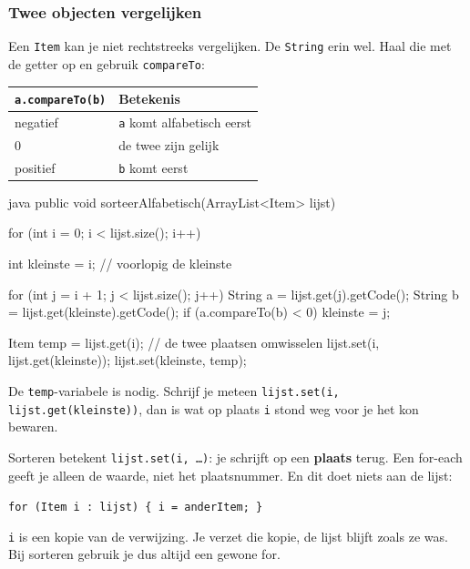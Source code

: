 \documentclass[a4paper,11pt]{article}
\begin{document}
\subsubsection{Twee objecten vergelijken}

Een \texttt{Item} kan je niet rechtstreeks vergelijken. De \texttt{String} erin
wel. Haal die met de getter op en gebruik \texttt{compareTo}:

\begin{center}
\begin{tabular}{@{}ll@{}}
\toprule
\texttt{a.compareTo(b)} & \textbf{Betekenis} \\
\midrule
negatief & \texttt{a} komt alfabetisch eerst \\
0        & de twee zijn gelijk \\
positief & \texttt{b} komt eerst \\
\bottomrule
\end{tabular}
\end{center}

\begin{codeblock}{java}
    public void sorteerAlfabetisch(ArrayList<Item> lijst)
    {
        for (int i = 0; i < lijst.size(); i++)
        {
            int kleinste = i;              // voorlopig de kleinste

            for (int j = i + 1; j < lijst.size(); j++)
            {
                String a = lijst.get(j).getCode();
                String b = lijst.get(kleinste).getCode();
                if (a.compareTo(b) < 0)
                {
                    kleinste = j;
                }
            }

            Item temp = lijst.get(i);      // de twee plaatsen omwisselen
            lijst.set(i, lijst.get(kleinste));
            lijst.set(kleinste, temp);
        }
    }
\end{codeblock}

De \texttt{temp}-variabele is nodig. Schrijf je meteen
\texttt{lijst.set(i, lijst.get(kleinste))}, dan is wat op plaats \texttt{i} stond
weg voor je het kon bewaren.

\begin{warningbox}
Sorteren betekent \texttt{lijst.set(i, \dots)}: je schrijft op een \textbf{plaats}
terug. Een for-each geeft je alleen de waarde, niet het plaatsnummer. En dit doet
niets aan de lijst:
\begin{center}
\texttt{for (Item i : lijst) \{ i = anderItem; \}}
\end{center}
\texttt{i} is een kopie van de verwijzing. Je verzet die kopie, de lijst blijft
zoals ze was. Bij sorteren gebruik je dus altijd een gewone for.
\end{warningbox}
\end{document}
